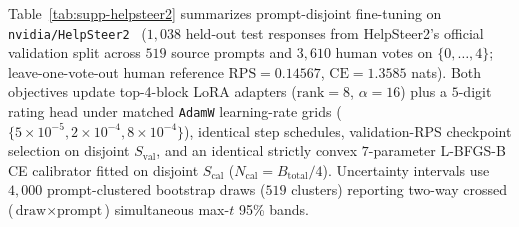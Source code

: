 Table~\ref{tab:supp-helpsteer2} summarizes prompt-disjoint fine-tuning on \texttt{nvidia/HelpSteer2}~\citep{wang2024helpsteer2} ($1{,}038$ held-out test responses from HelpSteer2's official validation split across $519$ source prompts and $3{,}610$ human votes on $\{0,\dots,4\}$; leave-one-vote-out human reference $\text{RPS}=0.14567$, $\text{CE}=1.3585$ nats).
Both objectives update top-4-block LoRA adapters ($\text{rank}=8$, $\alpha=16$) plus a $5$-digit rating head under matched \texttt{AdamW} learning-rate grids ($\{5\times 10^{-5}, 2\times 10^{-4}, 8\times 10^{-4}\}$), identical step schedules, validation-RPS checkpoint selection on disjoint $S_{\text{val}}$, and an identical strictly convex $7$-parameter L-BFGS-B CE calibrator fitted on disjoint $S_{\text{cal}}$ ($N_{\text{cal}}=B_{\text{total}}/4$).
Uncertainty intervals use $4{,}000$ prompt-clustered bootstrap draws ($519$ clusters) reporting two-way crossed ($\text{draw}\times\text{prompt}$) simultaneous max-$t$ 95\% bands.

